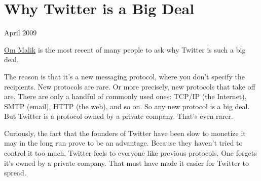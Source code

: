 \chapter{Why Twitter is a Big Deal}

April 2009

\href{http://gigaom.com/2009/04/03/google-may-buy-twitter-or-not-but-why-is-twitter-so-hot/}{Om
Malik} is the most recent of many people to ask why Twitter is such a
big deal.

The reason is that it's a new messaging protocol, where you don't
specify the recipients. New protocols are rare. Or more precisely, new
protocols that take off are. There are only a handful of commonly used
ones: TCP/IP (the Internet), SMTP (email), HTTP (the web), and so on. So
any new protocol is a big deal. But Twitter is a protocol owned by a
private company. That's even rarer.

Curiously, the fact that the founders of Twitter have been slow to
monetize it may in the long run prove to be an advantage. Because they
haven't tried to control it too much, Twitter feels to everyone like
previous protocols. One forgets it's owned by a private company. That
must have made it easier for Twitter to spread.